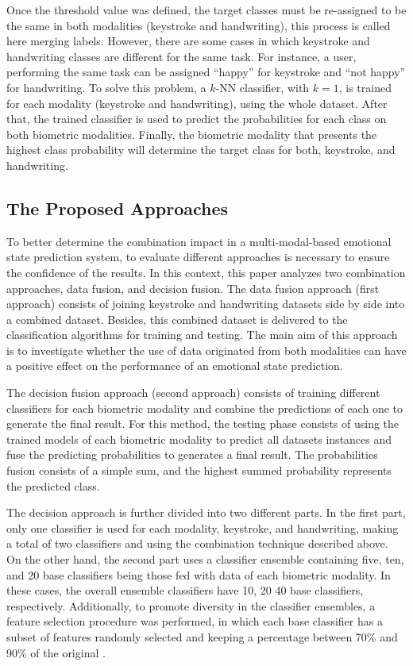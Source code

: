 \documentclass[conference]{IEEEtran}
\begin{document}
Once the threshold value was defined, the target classes must be re-assigned to be the same in both modalities (keystroke and handwriting), this process is called here merging labels. However, there are some cases in which keystroke and handwriting classes are different for the same task. For instance, a user, performing the same task can be assigned ``happy'' for keystroke and ``not happy'' for handwriting.
To solve this problem, a $k$-NN classifier, with $k = 1$, is trained for each modality (keystroke and handwriting), using the whole dataset. After that, the trained classifier is used to predict the probabilities for each class on both biometric modalities. Finally, the biometric modality that presents the highest class probability will determine the target class for both, keystroke, and handwriting.  


\subsection{The Proposed Approaches}

To better determine the combination impact in a multi-modal-based emotional state prediction system, to evaluate different approaches is necessary to ensure the confidence of the results. In this context, this paper analyzes two combination approaches, data fusion, and decision fusion. 
The data fusion approach (first approach) consists of joining keystroke and handwriting datasets side by side into a combined dataset. Besides, this combined dataset is delivered to the classification algorithms for training and testing. The main aim of this approach is to investigate whether the use of data originated from both modalities can have a positive effect on the performance of an emotional state prediction. 

The decision fusion approach (second approach) consists of training different classifiers for each biometric modality and combine the predictions of each one to generate the final result. 
For this method, the testing phase consists of using the trained models of each biometric modality to predict all datasets instances and fuse the predicting probabilities to generates a final result. The probabilities fusion consists of a simple sum, and the highest summed probability represents the predicted class.

The decision approach is further divided into two different parts. In the first part, only one classifier is used for each modality, keystroke, and handwriting, making a total of two classifiers and using the combination technique described above. 
On the other hand, the second part uses a classifier ensemble containing five, ten, and 20 base classifiers being those fed with data of each biometric modality. In these cases, the overall ensemble classifiers have 10, 20 40 base classifiers, respectively. Additionally, to promote diversity in the classifier ensembles, a feature selection procedure was performed, in which each base classifier has a subset of features randomly selected and keeping a percentage between 70\% and 90\% of the original \cite{dietterich-ensemble}. 
\end{document}
